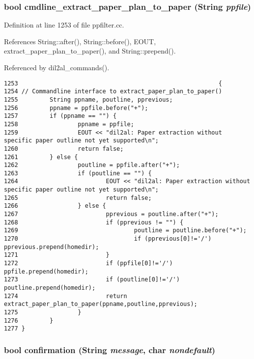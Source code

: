 \subsubsection{\setlength{\rightskip}{0pt plus 5cm}bool cmdline\_\-extract\_\-paper\_\-plan\_\-to\_\-paper ({\bf String} {\em ppfile})}\label{dil2al_8hh_a360}




Definition at line 1253 of file ppfilter.cc.

References String::after(), String::before(), EOUT, extract\_\-paper\_\-plan\_\-to\_\-paper(), and String::prepend().

Referenced by dil2al\_\-commands().



\footnotesize\begin{verbatim}1253                                                         {
1254 // Commandline interface to extract_paper_plan_to_paper()
1255         String ppname, poutline, pprevious;
1256         ppname = ppfile.before("+");
1257         if (ppname == "") {
1258                 ppname = ppfile;
1259                 EOUT << "dil2al: Paper extraction without specific paper outline not yet supported\n";
1260                 return false;
1261         } else {
1262                 poutline = ppfile.after("+");
1263                 if (poutline == "") {
1264                         EOUT << "dil2al: Paper extraction without specific paper outline not yet supported\n";
1265                         return false;
1266                 } else {
1267                         pprevious = poutline.after("+");
1268                         if (pprevious != "") {
1269                                 poutline = poutline.before("+");
1270                                 if (pprevious[0]!='/') pprevious.prepend(homedir);
1271                         }
1272                         if (ppfile[0]!='/') ppfile.prepend(homedir);
1273                         if (poutline[0]!='/') poutline.prepend(homedir);
1274                         return extract_paper_plan_to_paper(ppname,poutline,pprevious);
1275                 }
1276         }
1277 }
\end{verbatim}\normalsize 
{}
\subsubsection{\setlength{\rightskip}{0pt plus 5cm}bool confirmation ({\bf String} {\em message}, char {\em nondefault})}\label{dil2al_8hh_a226}




